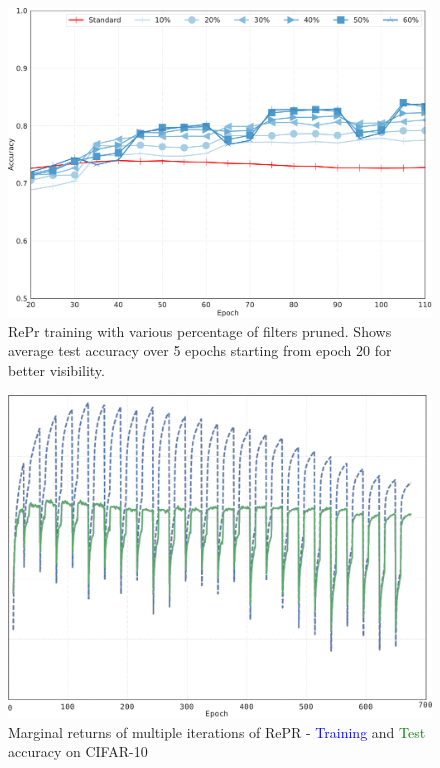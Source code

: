 \begin{figure}[H]
\center
    \includegraphics[width=0.8\linewidth]{figures/repr/percentage_pruned_X.pdf}
   \caption[Percentage of filters pruned]{RePr training with various percentage of filters pruned. Shows average test accuracy over 5 epochs starting from epoch 20 for better visibility.}
   \label{fig:ablation_percent}
\end{figure}


\begin{figure}[H]
\center
   \includegraphics[width=0.75\linewidth]{figures/repr/marginal_returns_no_y.pdf}
   \caption[Multiple Iterations of RePr]{Marginal returns of multiple iterations of RePR - \textcolor{blue}{Training} and \textcolor{green}{Test} accuracy on CIFAR-10}
   \label{fig:ablation_N_repeat}
\end{figure}



